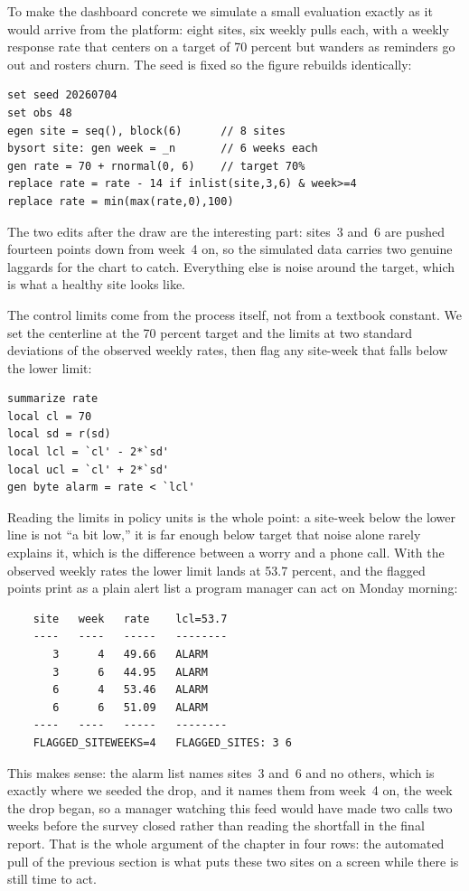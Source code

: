 \documentclass[
    a4paper,
    fontsize=10pt,
    twoside=true,
    numbers=noenddot,
]{kaobook}
\begin{document}
To make the dashboard concrete we simulate a small evaluation exactly as it would arrive from the platform: eight sites, six weekly pulls each, with a weekly response rate that centers on a target of 70 percent but wanders as reminders go out and rosters churn. The seed is fixed so the figure rebuilds identically:
{\footnotesize
\begin{verbatim}
set seed 20260704
set obs 48
egen site = seq(), block(6)      // 8 sites
bysort site: gen week = _n       // 6 weeks each
gen rate = 70 + rnormal(0, 6)    // target 70%
replace rate = rate - 14 if inlist(site,3,6) & week>=4
replace rate = min(max(rate,0),100)
\end{verbatim}
}
The two edits after the draw are the interesting part: sites~3 and~6 are pushed fourteen points down from week~4 on, so the simulated data carries two genuine laggards for the chart to catch. Everything else is noise around the target, which is what a healthy site looks like.

The control limits come from the process itself, not from a textbook constant. We set the centerline at the 70 percent target and the limits at two standard deviations of the observed weekly rates, then flag any site-week that falls below the lower limit:
{\footnotesize
\begin{verbatim}
summarize rate
local cl = 70
local sd = r(sd)
local lcl = `cl' - 2*`sd'
local ucl = `cl' + 2*`sd'
gen byte alarm = rate < `lcl'
\end{verbatim}
}
Reading the limits in policy units is the whole point: a site-week below the lower line is not \enquote{a bit low,} it is far enough below target that noise alone rarely explains it, which is the difference between a worry and a phone call. With the observed weekly rates the lower limit lands at 53.7 percent, and the flagged points print as a plain alert list a program manager can act on Monday morning:
{\footnotesize
\begin{verbatim}
    site   week   rate    lcl=53.7
    ----   ----   -----   --------
       3      4   49.66   ALARM
       3      6   44.95   ALARM
       6      4   53.46   ALARM
       6      6   51.09   ALARM
    ----   ----   -----   --------
    FLAGGED_SITEWEEKS=4   FLAGGED_SITES: 3 6
\end{verbatim}
}
This makes sense: the alarm list names sites~3 and~6 and no others, which is exactly where we seeded the drop, and it names them from week~4 on, the week the drop began, so a manager watching this feed would have made two calls two weeks before the survey closed rather than reading the shortfall in the final report. That is the whole argument of the chapter in four rows: the automated pull of the previous section is what puts these two sites on a screen while there is still time to act.
\end{document}
